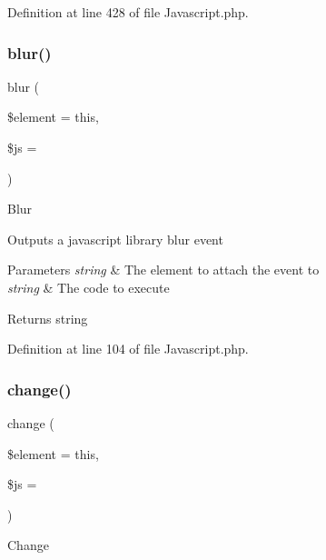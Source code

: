 Definition at line 428 of file Javascript.\+php.

\mbox{\label{class_c_i___javascript_a3aacb753ebd61030bad68fb877e52699}} 
\subsubsection{\texorpdfstring{blur()}{blur()}}
{\footnotesize\ttfamily blur (\begin{DoxyParamCaption}\item[{}]{\$element = {\ttfamily \textquotesingle{}this\textquotesingle{}},  }\item[{}]{\$js = {\ttfamily \textquotesingle{}\textquotesingle{}} }\end{DoxyParamCaption})}

Blur

Outputs a javascript library blur event


\begin{DoxyParams}{Parameters}
{\em string} & The element to attach the event to \\
\hline
{\em string} & The code to execute \\
\hline
\end{DoxyParams}
\begin{DoxyReturn}{Returns}
string 
\end{DoxyReturn}


Definition at line 104 of file Javascript.\+php.

\mbox{\label{class_c_i___javascript_a65a4442663cf513c7f18abfc6f0955aa}} 
\subsubsection{\texorpdfstring{change()}{change()}}
{\footnotesize\ttfamily change (\begin{DoxyParamCaption}\item[{}]{\$element = {\ttfamily \textquotesingle{}this\textquotesingle{}},  }\item[{}]{\$js = {\ttfamily \textquotesingle{}\textquotesingle{}} }\end{DoxyParamCaption})}

Change

